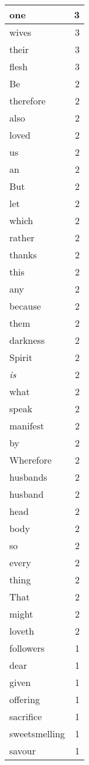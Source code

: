 \begin{center}
\begin{longtable}{l|r}
one & 3\\ \hline 
wives & 3\\ \hline 
their & 3\\ \hline 
flesh & 3\\ \hline 
Be & 2\\ \hline 
therefore & 2\\ \hline 
also & 2\\ \hline 
loved & 2\\ \hline 
us & 2\\ \hline 
an & 2\\ \hline 
But & 2\\ \hline 
let & 2\\ \hline 
which & 2\\ \hline 
rather & 2\\ \hline 
thanks & 2\\ \hline 
this & 2\\ \hline 
any & 2\\ \hline 
because & 2\\ \hline 
them & 2\\ \hline 
darkness & 2\\ \hline 
Spirit & 2\\ \hline 
\emph{is} & 2\\ \hline 
what & 2\\ \hline 
speak & 2\\ \hline 
manifest & 2\\ \hline 
by & 2\\ \hline 
Wherefore & 2\\ \hline 
husbands & 2\\ \hline 
husband & 2\\ \hline 
head & 2\\ \hline 
body & 2\\ \hline 
so & 2\\ \hline 
every & 2\\ \hline 
thing & 2\\ \hline 
That & 2\\ \hline 
might & 2\\ \hline 
loveth & 2\\ \hline 
followers & 1\\ \hline 
dear & 1\\ \hline 
given & 1\\ \hline 
offering & 1\\ \hline 
sacrifice & 1\\ \hline 
sweetsmelling & 1\\ \hline 
savour & 1\\ \hline 

\end{longtable}
\end{center}
